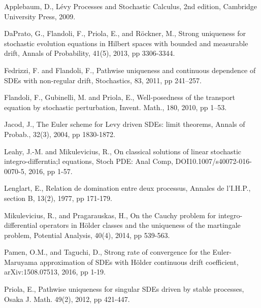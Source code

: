 \documentclass[11pt]{amsart}
\theoremstyle{plain}
\numberwithin{equation}{section}
\begin{document}
\begin{thebibliography}{99}
 Applebaum, D., L\'{e}vy Processes and Stochastic Calculus, 2nd
edition, Cambridge University Press, 2009.

 DaPrato, G., Flandoli, F., Priola, E., and R\"{o}ckner, M.,
Strong uniqueness for stochastic evolution equations in Hilbert spaces with
bounded and measurable drift, Annals of Probability, 41(5), 2013, pp
3306-3344.

 Fedrizzi, F. and Flandoli, F., Pathwise uniqueness and
continuous dependence of SDEs with non-regular drift, Stochastics, 83, 2011,
pp 241--257.

 Flandoli, F., Gubinelli, M. and Priola, E., Well-posedness of
the transport equation by stochastic perturbation, Invent. Math., 180, 2010,
pp 1--53.

 Jacod, J., The Euler scheme for Levy driven SDEs: limit
theorems, Annals of Probab., 32(3), 2004, pp 1830-1872.

 Leahy, J.-M. and Mikulevicius, R., On classical solutions of
linear stochastic integro-differntia;l equations, Stoch PDE: Anal Comp,
DOI10.1007/s40072-016-0070-5, 2016, pp 1-57.

 Lenglart, E., Relation de domination entre deux processus,
Annales de l'I.H.P., section B, 13(2), 1977, pp 171-179.

 Mikulevicius, R., and Pragarauskas, H., On the Cauchy problem
for integro-differential operators in H\"{o}lder classes and the uniqueness
of the martingale problem, Potential Analysis, 40(4), 2014, pp 539-563.

 Pamen, O.M., and Taguchi, D., Strong rate of convergence for
the Euler-Maruyama approximation of SDEs with H\"{o}lder continuous drift
coefficient, arXiv:1508.07513, 2016, pp 1-19.

 Priola, E., Pathwise uniqueness for singular SDEs driven by
stable processes, Osaka J. Math. 49(2), 2012, pp 421-447.
\end{thebibliography}
\end{document}
